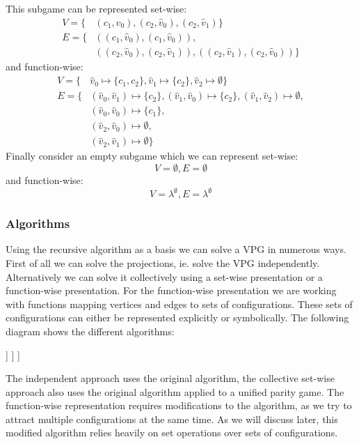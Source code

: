\begin{example}
	This subgame can be represented set-wise:
	\begin{align*}
	V = \{&(c_1,\hat{v}_0),(c_2,\hat{v}_0),(c_2,\hat{v}_1) \}\\
	E = \{& ((c_1,\hat{v}_0),(c_1,\hat{v}_0)), \\
	&((c_2,\hat{v}_0),(c_2,\hat{v}_1)),((c_2,\hat{v}_1),(c_2,\hat{v}_0)) \}
	\end{align*}
	and function-wise:
	\begin{align*}
	V = \{&\hat{v}_0 \mapsto \{c_1,c_2\},\hat{v}_1 \mapsto \{c_2\},\hat{v}_2 \mapsto \emptyset\}\\
	E = \{&(\hat{v}_0,\hat{v}_1) \mapsto \{c_2\},(\hat{v}_1,\hat{v}_0) \mapsto \{c_2\},(\hat{v}_1,\hat{v}_2) \mapsto \emptyset,\\
	&(\hat{v}_0,\hat{v}_0) \mapsto \{c_1\},\\
	&(\hat{v}_2,\hat{v}_0) \mapsto \emptyset,\\
	&(\hat{v}_2,\hat{v}_1) \mapsto \emptyset\}
	\end{align*}
	Finally consider an empty subgame which we can represent set-wise:
	\[ V = \emptyset, E = \emptyset \]
	and function-wise:
	\[ V = \lambda^\emptyset, E = \lambda^\emptyset \]
\end{example}

\subsubsection{Algorithms}
Using the recursive algorithm as a basis we can solve a VPG in numerous ways. First of all we can solve the projections, ie. solve the VPG independently. Alternatively we can solve it collectively using a set-wise presentation or a function-wise presentation. For the function-wise presentation we are working with functions mapping vertices and edges to sets of configurations. These sets of configurations can either be represented explicitly or symbolically. The following diagram shows the different algorithms:
\begin{center}
	\begin{forest}
		[Recursive algorithm, for tree={parent anchor=south, child anchor=north, align=center, s sep=5mm}
		[Independent]
		[Collective
		[Set-wise]
		[Function-wise
		[Explicit]
		[Symbolic]
		]
		]
		]
	\end{forest}
\end{center}
The independent approach uses the original algorithm, the collective set-wise approach also uses the original algorithm applied to a unified parity game. The function-wise representation requires modifications to the algorithm, as we try to attract multiple configurations at the same time. As we will discuss later, this modified algorithm relies heavily on set operations over sets of configurations. 

